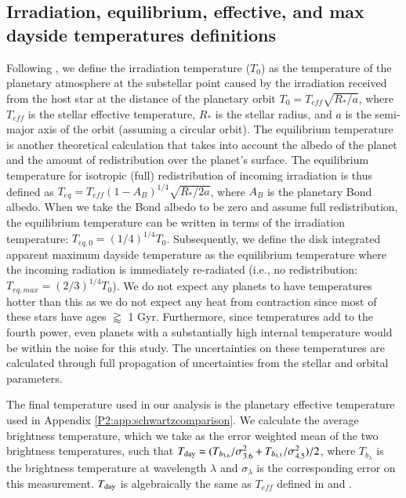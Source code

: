 \subsection{Irradiation, equilibrium, effective, and max dayside temperatures definitions}
\label{P2:app:Temps}

Following \citet{Hansen2008}, we define the irradiation temperature ($T_0$) as the temperature of the planetary atmosphere at the  substellar point caused by the irradiation received from the host star at the distance of the planetary orbit $T_0 = T_{eff} \sqrt{R_*/a}$, where $T_{eff}$ is the stellar effective temperature, $R_*$ is the stellar radius, and $a$ is the semi-major axis of the orbit (assuming a circular orbit).
The equilibrium temperature is another theoretical calculation that takes into account the albedo of the planet and the amount of redistribution over the planet's surface. The equilibrium temperature for isotropic (full) redistribution of incoming irradiation is thus defined as $T_{eq} = T_{eff}(1-A_B)^{1/4} \sqrt{R_*/2a}$, where $A_B$ is the planetary Bond albedo. When we take the Bond albedo to be zero and assume full redistribution, the equilibrium temperature can be written in terms of the irradiation temperature: $T_{eq,\textit{0}} = (1/4)^{1/4} T_0$. Subsequently, we define the disk integrated apparent maximum dayside temperature \citep{Schwartz2017} as the equilibrium temperature where the incoming radiation is immediately re-radiated (i.e., no redistribution: $T_{eq,max} = (2/3)^{1/4} T_0$). We do not expect any planets to have temperatures hotter than this as we do not expect any heat from contraction since most of these stars have ages $\gtrapprox$ 1 Gyr. Furthermore, since temperatures add to the fourth power, even planets with a substantially high internal temperature \citep[e.g.,][]{Thorngren2019} would be within the noise for this study. The uncertainties on these temperatures are calculated through full propagation of uncertainties from the stellar and orbital parameters.

The final temperature used in our analysis is the planetary effective temperature used in Appendix \ref{P2:app:schwartzcomparison}. We calculate the average brightness temperature, which we take as the error weighted mean of the two brightness temperatures, such that $T_{\rm day} = (T_{b_{3.6}}/ \sigma_{3.6}^2 +  T_{b_{4.5}}/\sigma_{4.5}^2) / 2 $, where $T_{b_{\lambda}}$ is the brightness temperature at wavelength $\lambda$ and $\sigma_{\lambda}$ is the corresponding error on this measurement. $T_{\rm day}$ is algebraically the same as $T_{eff}$ defined in \citet{Schwartz2015} and \citet{Cowan2011b}.

